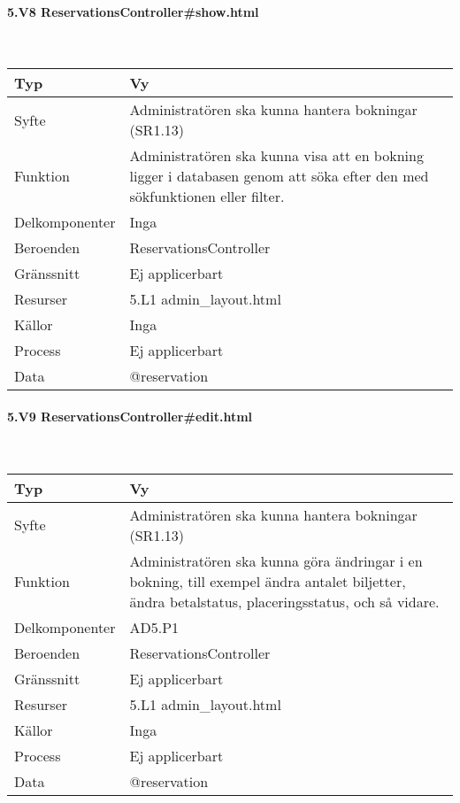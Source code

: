 \documentclass[a4paper, twoside, 11pt, titlepage]{article}
\begin{document}
			\paragraph{5.V8 ReservationsController\#show.html}\

			\begin {table} [ht] \begin{tabular} {  p{3.5cm} p{9.6cm} }
				\hline
				Typ & Vy  \\
				\hline
				Syfte & Administratören ska kunna hantera bokningar (SR1.13)  \\
				\hline
				Funktion & Administratören ska kunna visa att en bokning ligger i databasen genom att söka efter den med sökfunktionen eller filter.  \\
				\hline
				Delkomponenter & Inga  \\
				\hline
				Beroenden & ReservationsController  \\
				\hline
				Gränssnitt & Ej applicerbart  \\
				\hline
				Resurser & 5.L1 admin\_layout.html  \\
				\hline
				Källor & Inga  \\
				\hline
				Process & Ej applicerbart  \\
				\hline
				Data & @reservation  \\
				\hline
			\end{tabular} \end{table} \FloatBarrier


			\paragraph{5.V9 ReservationsController\#edit.html}\

			\begin {table} [ht] \begin{tabular} {  p{3.5cm} p{9.6cm} }
				\hline
				Typ & Vy  \\
				\hline
				Syfte & Administratören ska kunna hantera bokningar (SR1.13)  \\
				\hline
				Funktion & Administratören ska kunna göra ändringar i en bokning, till exempel ändra antalet biljetter, ändra betalstatus, placeringsstatus, och så vidare.  \\
				\hline
				Delkomponenter & AD5.P1  \\
				\hline
				Beroenden & ReservationsController  \\
				\hline
				Gränssnitt & Ej applicerbart  \\
				\hline
				Resurser & 5.L1 admin\_layout.html  \\
				\hline
				Källor & Inga  \\
				\hline
				Process & Ej applicerbart  \\
				\hline
				Data & @reservation  \\
				\hline
			\end{tabular} \end{table} \FloatBarrier
\end{document}
